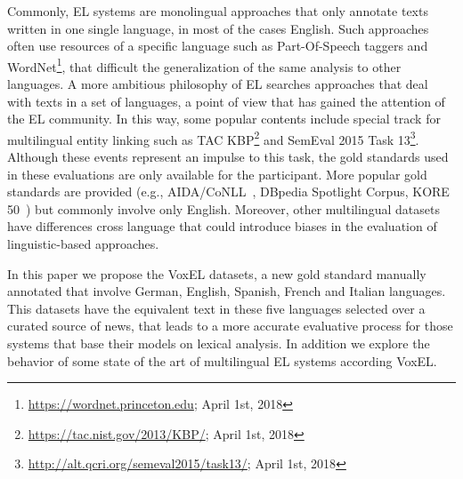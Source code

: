 \documentclass{llncs}
\begin{document}
Commonly, EL systems are monolingual approaches that only annotate texts written in one single language, in most of the cases English. Such approaches often use resources of a specific language such as Part-Of-Speech taggers and WordNet\footnote{\url{https://wordnet.princeton.edu}; April 1st, 2018}, that difficult the generalization of the same analysis to other languages. A more ambitious philosophy of EL searches approaches that deal with texts in a set of languages, a point of view that has gained the attention of the EL community. In this way, some popular contents include special track for multilingual entity linking such as TAC KBP\footnote{\url{https://tac.nist.gov/2013/KBP/}; April 1st, 2018}%
and SemEval 2015 Task 13\footnote{\url{http://alt.qcri.org/semeval2015/task13/}; April 1st, 2018}. Although these events represent an impulse to this task, the gold standards used in these evaluations are only available for the participant. More popular gold standards are provided (e.g., AIDA/CoNLL~\cite{aida2011}, DBpedia Spotlight Corpus\cite{mendes2011dbpedia}, KORE 50~\cite{kore50}) but commonly involve only English. Moreover, other multilingual datasets have differences cross language that could  introduce biases in the evaluation of linguistic-based approaches.

In this paper we propose the VoxEL datasets, a new gold standard manually annotated that involve German, English, Spanish, French and Italian languages. This datasets have the equivalent text in these five languages selected over a curated source of news, that leads to a more accurate evaluative process for those systems that base their models on lexical analysis. In addition we explore the behavior of some state of the art of multilingual EL systems according VoxEL.
\end{document}

